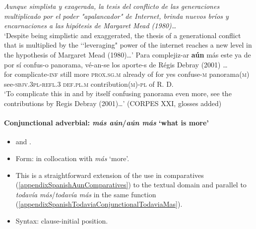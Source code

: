 \begin{exe}
	\ex\label{exAppendixSpanishAunComparisons3}
	\textit{Aunque simplista y exagerada, la tesis del conflicto de las generaciones multiplicado por el poder "apalancador" de Internet, brinda nuevos bríos y encarnaciones a las hipótesis de Margaret Mead (1980)…}\\
	\lq Despite being simplistic and exaggerated, the thesis of a generational conflict that is multiplied by the \lq\lq leveraging" power of the internet reaches a new level in the hypothesis of Margaret Mead (1980)…'
	\gll Para complejiz-ar \textbf{aún} más este ya de por sí confus-o panorama, vé-an-se los aporte-s de Régis Debray (2001) …\\
	for complicate-\textsc{inf} still more \textsc{prox}.\textsc{sg}.\textsc{m} already of for yes confuse-\textsc{m} panorama(\textsc{m}) see-\textsc{sbjv}.3\textsc{pl}-\textsc{refl}.3 \textsc{def}.\textsc{pl}.\textsc{m} contribution(\textsc{m})-\textsc{pl} of R. D. \\
	\glt \lq To complicate this in and by itself confusing panorama even more, see the contributions by Regis Debray (2001)…' (CORPES XXI, glosses added)
\end{exe}



\paragraph{Conjunctional adverbial: \textit{más aún}/\textit{aún más} \lq what is more'}
\label{appendixSpanishAunConjunctionalAunMas}
\begin{itemize}
	\item \textcite[s.v. más aún]{DPDE} and \textcite[346]{FuentesRodriguez2018}.
	\item Form: in collocation with \textit{más} \lq more'.
	\item This is a straightforward extension of the use in comparatives (\ref{appendixSpanishAunComparatives}) to the textual domain and parallel to \textit{todavía más}/\textit{todavía más} in the same function (\ref{appendixSpanishTodaviaConjunctionalTodaviaMas}).
	\item Syntax: clause-initial position.
\end{itemize}
\largerpage[2]


